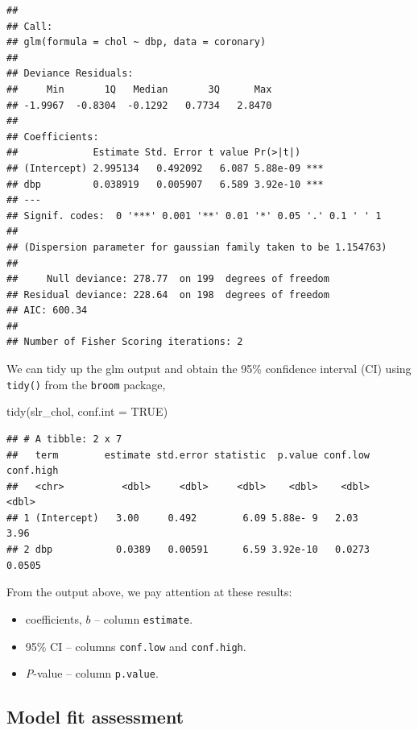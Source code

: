 \documentclass[
  10pt,
]{krantz}
\newenvironment{Shaded}{\begin{snugshade}}{\end{snugshade}}
\newcommand{\AttributeTok}[1]{\textcolor[rgb]{0.77,0.63,0.00}{#1}}
\newcommand{\ConstantTok}[1]{\textcolor[rgb]{0.00,0.00,0.00}{#1}}
\newcommand{\FunctionTok}[1]{\textcolor[rgb]{0.00,0.00,0.00}{#1}}
\newcommand{\NormalTok}[1]{#1}
\providecommand{\tightlist}{%
  \setlength{\itemsep}{0pt}\setlength{\parskip}{0pt}}
\begin{document}
\begin{verbatim}
## 
## Call:
## glm(formula = chol ~ dbp, data = coronary)
## 
## Deviance Residuals: 
##     Min       1Q   Median       3Q      Max  
## -1.9967  -0.8304  -0.1292   0.7734   2.8470  
## 
## Coefficients:
##             Estimate Std. Error t value Pr(>|t|)    
## (Intercept) 2.995134   0.492092   6.087 5.88e-09 ***
## dbp         0.038919   0.005907   6.589 3.92e-10 ***
## ---
## Signif. codes:  0 '***' 0.001 '**' 0.01 '*' 0.05 '.' 0.1 ' ' 1
## 
## (Dispersion parameter for gaussian family taken to be 1.154763)
## 
##     Null deviance: 278.77  on 199  degrees of freedom
## Residual deviance: 228.64  on 198  degrees of freedom
## AIC: 600.34
## 
## Number of Fisher Scoring iterations: 2
\end{verbatim}

We can tidy up the glm output and obtain the 95\% confidence interval (CI) using \texttt{tidy()} from the \texttt{broom} package,

\begin{Shaded}
\begin{Highlighting}[]
\FunctionTok{tidy}\NormalTok{(slr\_chol, }\AttributeTok{conf.int =} \ConstantTok{TRUE}\NormalTok{)}
\end{Highlighting}
\end{Shaded}

\begin{verbatim}
## # A tibble: 2 x 7
##   term        estimate std.error statistic  p.value conf.low conf.high
##   <chr>          <dbl>     <dbl>     <dbl>    <dbl>    <dbl>     <dbl>
## 1 (Intercept)   3.00     0.492        6.09 5.88e- 9   2.03      3.96  
## 2 dbp           0.0389   0.00591      6.59 3.92e-10   0.0273    0.0505
\end{verbatim}

From the output above, we pay attention at these results:

\begin{itemize}
\tightlist
\item
  coefficients, \(b\) -- column \texttt{estimate}.
\item
  95\% CI -- columns \texttt{conf.low} and \texttt{conf.high}.
\item
  \emph{P}-value -- column \texttt{p.value}.
\end{itemize}

\hypertarget{model-fit-assessment}{%
\subsection{\texorpdfstring{Model fit assessment}{Model fit assessment}}\label{model-fit-assessment}}
\end{document}
